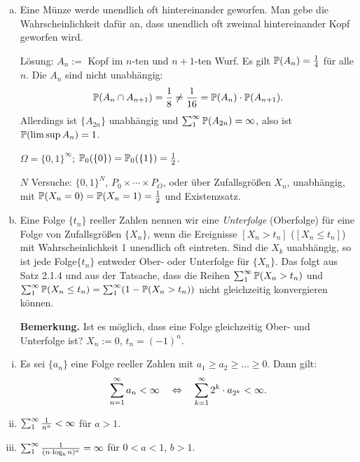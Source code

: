 \begin{exmp}
  \begin{enumerate}[(a)]
  \item Eine Münze werde unendlich oft hintereinander geworfen. Man gebe die
    Wahrscheinlichkeit dafür an, dass unendlich oft zweimal hintereinander Kopf
    geworfen wird.

    Lösung: $A_n :=$ Kopf im $n$-ten und $n+1$-ten Wurf. Es gilt $\mathbb{P}(A_n) =
    \frac{1}{4}$ für alle $n$. Die $A_n$ sind nicht unabhängig:
    \[ \mathbb{P}( A_n \cap A_{n+1}) = \frac{1}{8} \ne \frac{1}{16} = \mathbb{P}(A_n) \cdot
      \mathbb{P}(A_{n+1}). \]
    Allerdings ist $\{A_{2n}\}$ unabhängig und $\sum_1^\infty \mathbb{P}(A_{2n}) =
    \infty$, also ist $\mathbb{P}(\limsup A_n) = 1$.

    $\Omega = \{0,1\}^\infty$; $\mathbb{P}_0(\{0\}) = \mathbb{P}_0(\{1\}) =\frac{1}{2}$.

    $N$ Versuche: $\{0,1\}^N$, $P_0 \times \cdots \times P_O$, oder über
    Zufallsgrößen $X_n$, unabhängig, mit $\mathbb{P}(X_n=0) = \mathbb{P}(X_n=1) = \frac{1}{2}$ und
    Existenzsatz.
  \item Eine Folge $\{t_n\}$ reeller Zahlen nennen wir eine \emph{Unterfolge}
    (Oberfolge) für eine Folge von Zufallsgrößen $\{X_n\}$, wenn die Ereignisse
    $[X_n > t_n]$ ($[X_n \le t_n]$) mit Wahrscheinlichkeit 1 unendlich oft
    eintreten. Sind die $X_k$ unabhängig, so ist jede Folge$\{t_n\}$ entweder
    Ober- oder Unterfolge für $\{X_n\}$. Das folgt aus Satz 2.1.4 und aus der
    Tatsache, dass die Reihen $\sum_1^\infty \mathbb{P}(X_n > t_n)$ und $\sum_1^\infty
    \mathbb{P}(X_n \le t_n) = \sum_1^\infty (1-\mathbb{P}(X_n > t_n))$ nicht gleichzeitig
    konvergieren können.

    \textbf{Bemerkung.} Ist es möglich, dass eine Folge gleichzeitig Ober- und
    Unterfolge ist? $X_n := 0$, $t_n = (-1)^n$.
  \end{enumerate}
\end{exmp}

\begin{lem}
  \begin{enumerate}[(i)]
  \item Es sei $\{a_n\}$ eine Folge reeller Zahlen mit $a_1 \ge a_2 \ge \ldots
    \ge 0$. Dann gilt:
    \[ \sum_{n=1}^\infty a_n < \infty \quad \Leftrightarrow \quad \sum_{k=1}^\infty 2^k \cdot a_{2^k}
      < \infty. \]
  \item $\sum_1^\infty \frac{1}{n^a} < \infty$ für $a > 1$.
  \item $\sum_1^\infty \frac{1}{(n \cdot \log_b n)^a} = \infty$ für $0 < a <
    1$, $b>1$.
  \end{enumerate}
\end{lem}  


